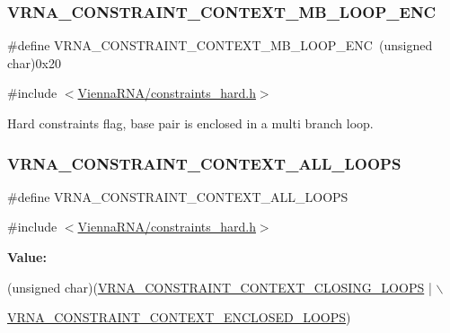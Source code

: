 \subsubsection{\texorpdfstring{V\+R\+N\+A\+\_\+\+C\+O\+N\+S\+T\+R\+A\+I\+N\+T\+\_\+\+C\+O\+N\+T\+E\+X\+T\+\_\+\+M\+B\+\_\+\+L\+O\+O\+P\+\_\+\+E\+NC}{VRNA\_CONSTRAINT\_CONTEXT\_MB\_LOOP\_ENC}}
{\footnotesize\ttfamily \#define V\+R\+N\+A\+\_\+\+C\+O\+N\+S\+T\+R\+A\+I\+N\+T\+\_\+\+C\+O\+N\+T\+E\+X\+T\+\_\+\+M\+B\+\_\+\+L\+O\+O\+P\+\_\+\+E\+NC~(unsigned char)0x20}



{\ttfamily \#include $<$\mbox{\hyperlink{constraints__hard_8h}{Vienna\+R\+N\+A/constraints\+\_\+hard.\+h}}$>$}



Hard constraints flag, base pair is enclosed in a multi branch loop. 

\mbox{\label{group__hard__constraints_ga886d9127c49bb982a4b67cd7581e8a5a}} 
\subsubsection{\texorpdfstring{V\+R\+N\+A\+\_\+\+C\+O\+N\+S\+T\+R\+A\+I\+N\+T\+\_\+\+C\+O\+N\+T\+E\+X\+T\+\_\+\+A\+L\+L\+\_\+\+L\+O\+O\+PS}{VRNA\_CONSTRAINT\_CONTEXT\_ALL\_LOOPS}}
{\footnotesize\ttfamily \#define V\+R\+N\+A\+\_\+\+C\+O\+N\+S\+T\+R\+A\+I\+N\+T\+\_\+\+C\+O\+N\+T\+E\+X\+T\+\_\+\+A\+L\+L\+\_\+\+L\+O\+O\+PS}



{\ttfamily \#include $<$\mbox{\hyperlink{constraints__hard_8h}{Vienna\+R\+N\+A/constraints\+\_\+hard.\+h}}$>$}

{\bfseries Value\+:}
\begin{DoxyCode}
(\textcolor{keywordtype}{unsigned} char)(\mbox{\hyperlink{constraints__hard_8h_a10675929fdc14c5f81df49d77933067a}{VRNA\_CONSTRAINT\_CONTEXT\_CLOSING\_LOOPS}} | \(\backslash\)
                                                              
      \mbox{\hyperlink{constraints__hard_8h_ae03ed6ba25cf3cefdf36516e4081eb17}{VRNA\_CONSTRAINT\_CONTEXT\_ENCLOSED\_LOOPS}})
\end{DoxyCode}


